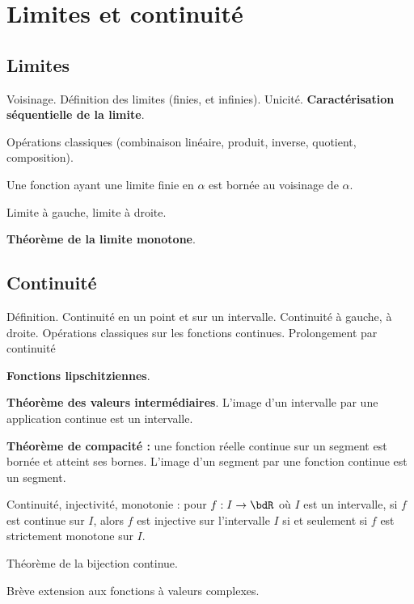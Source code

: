 \documentclass[a4paper,french,bookmarks]{article}
\begin{document}

\section*{Limites et continuité}

\subsection*{Limites}

\begin{enumerate}
    \ithand Voisinage. Définition des limites (finies, et infinies). Unicité. \textbf{Caractérisation séquentielle de la limite}.
    
    \ithand Opérations classiques (combinaison linéaire, produit, inverse, quotient, composition).
    
    \ithand Une fonction ayant une limite finie en $\alpha$ est bornée au voisinage de $\alpha$.
    
    \ithand Limite à gauche, limite à droite.
    
    \ithand \textbf{Théorème de la limite monotone}.

\end{enumerate}

\subsection*{Continuité}

\begin{enumerate}
    \ithand Définition. Continuité en un point et sur un intervalle. Continuité à gauche, à droite. Opérations classiques sur les fonctions continues. Prolongement par continuité
    
    \ithand \textbf{Fonctions lipschitziennes}.
    
    \ithand \textbf{Théorème des valeurs intermédiaires}. L'image d'un intervalle par une application continue est un intervalle.
    
    \ithand \textbf{Théorème de compacité :} une fonction réelle continue sur un segment est bornée et atteint ses bornes. L’image d’un segment par une fonction continue est un segment.
    
    \ithand Continuité, injectivité, monotonie : pour $f : I \to \bdR$ où $I$ est un intervalle, si $f$ est continue sur $I$, alors $f$ est injective sur l’intervalle $I$ si et seulement si $f$ est strictement monotone sur $I$.
    
    \ithand Théorème de la bijection continue.
    
    \ithand Brève extension aux fonctions à valeurs complexes.

\end{enumerate}
\end{document}
